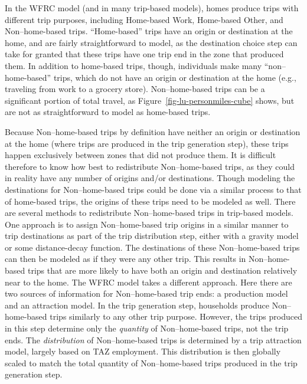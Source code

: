 \documentclass[fancy, twoside, mastersfancy, ms]{byuthesis}
\begin{document}
In the WFRC model (and in many trip-based models), homes produce trips
with different trip purposes, including Home-based Work, Home-based
Other, and Non--home-based trips. ``Home-based'' trips have an origin or
destination at the home, and are fairly straightforward to model, as the
destination choice step can take for granted that these trips have one
trip end in the zone that produced them. In addition to home-based
trips, though, individuals make many ``non--home-based'' trips, which do
not have an origin or destination at the home (e.g., traveling from work
to a grocery store). Non--home-based trips can be a significant portion
of total travel, as Figure~\ref{fig-lu-personmiles-cube} shows, but are
not as straightforward to model as home-based trips.

Because Non--home-based trips by definition have neither an origin or
destination at the home (where trips are produced in the trip generation
step), these trips happen exclusively between zones that did not produce
them. It is difficult therefore to know how best to redistribute
Non--home-based trips, as they could in reality have any number of
origins and/or destinations. Though modeling the destinations for
Non--home-based trips could be done via a similar process to that of
home-based trips, the origins of these trips need to be modeled as well.
There are several methods to redistribute Non--home-based trips in
trip-based models. One approach is to assign Non--home-based trip
origins in a similar manner to trip destinations as part of the trip
distribution step, either with a gravity model or some distance-decay
function. The destinations of these Non--home-based trips can then be
modeled as if they were any other trip. This results in Non--home-based
trips that are more likely to have both an origin and destination
relatively near to the home. The WFRC model takes a different approach.
Here there are two sources of information for Non--home-based trip ends:
a production model and an attraction model. In the trip generation step,
households produce Non--home-based trips similarly to any other trip
purpose. However, the trips produced in this step determine only the
\emph{quantity} of Non--home-based trips, not the trip ends. The
\emph{distribution} of Non--home-based trips is determined by a trip
attraction model, largely based on TAZ employment. This distribution is
then globally scaled to match the total quantity of Non--home-based
trips produced in the trip generation step.
\end{document}

